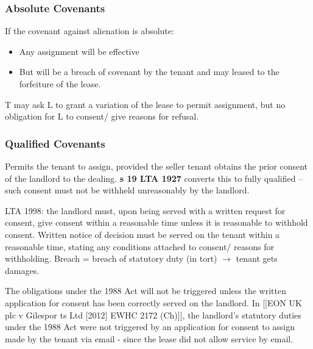 \documentclass[
]{article}
\newenvironment{Shaded}{}{}
\newcommand{\NormalTok}[1]{#1}
\providecommand{\tightlist}{%
  \setlength{\itemsep}{0pt}\setlength{\parskip}{0pt}}
\begin{document}
\hypertarget{absolute-covenants}{%
\subsubsection{Absolute Covenants}\label{absolute-covenants}}

If the covenant against alienation is absolute:

\begin{itemize}
\tightlist
\item
  Any assignment will be effective
\item
  But will be a breach of covenant by the tenant and may leased to the
  forfeiture of the lease.
\end{itemize}

T may ask L to grant a variation of the lease to permit assignment, but
no obligation for L to consent/ give reasons for refusal.

\hypertarget{qualified-covenants}{%
\subsubsection{Qualified Covenants}\label{qualified-covenants}}

Permits the tenant to assign, provided the seller tenant obtains the
prior consent of the landlord to the dealing. \textbf{s 19 LTA 1927}
converts this to fully qualified -- such consent must not be withheld
unreasonably by the landlord.

LTA 1998: the landlord must, upon being served with a written request
for consent, give consent within a reasonable time unless it is
reasonable to withhold consent. Written notice of decision must be
served on the tenant within a reasonable time, stating any conditions
attached to consent/ reasons for withholding. Breach = breach of
statutory duty (in tort) \(\rightarrow\) tenant gets damages.

\begin{Shaded}
\begin{Highlighting}[]
\NormalTok{The obligations under the 1988 Act will not be triggered unless the written application for consent has been correctly served on the landlord. In [[EON UK plc v Gilespor ts Ltd [2012] EWHC 2172 (Ch)]], the landlord’s statutory duties}
\NormalTok{under the 1988 Act were not triggered by an application for consent to assign made by the tenant via email {-} since the lease did not allow service by email.}
\end{Highlighting}
\end{Shaded}
\end{document}
